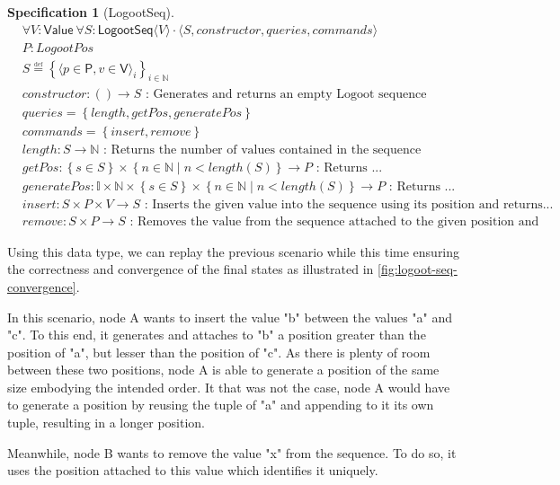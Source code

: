 \documentclass{article}
\newcommand{\commands}[1]{commands = \set{#1}}
\newcommand{\defeq}{\overset{\underset{\mathrm{def}}{}}{=}}
\newcommand{\fnspec}[3]{#1: #2 \text{ : #3}}
\newcommand{\inbb}[1]{\in \mathbb{#1}}
\newcommand{\queries}[1]{queries = \set{#1}}
\newcommand{\set}[1]{\left\{#1\right\}} %
\newcommand{\spectuple}[1]{\tuple{#1, constructor, queries, commands}}
\newcommand{\ssep}{\mid} %
\newcommand{\tuple}[1]{\langle #1 \rangle}
\theoremstyle{definition}
\newtheorem{specification}{Specification}
\begin{document}
\begin{specification}[LogootSeq]
    \begin{align*}
    &\forall V: \mathsf{Value} \ \forall S: \mathsf{LogootSeq} \tuple{V} \cdot \spectuple{S}\\
    &P: LogootPos\\
    &S \defeq \set{\tuple{p \in \mathsf{P}, v \in \mathsf{V}}_i}_{i \inbb{N}}\\
    &\fnspec{constructor}{\left( \right) \to S}{Generates and returns an empty Logoot sequence}\\
    &\queries{length, getPos, generatePos}\\
    &\commands{insert, remove}\\
    &\fnspec{length}{S \to \mathbb{N}}{Returns the number of values contained in the sequence}\\
    &\fnspec{getPos}{\set{s \in S} \times \set{n \inbb{N} \ssep n < length(S)} \to P}{Returns ...}\\
    &\fnspec{generatePos}{\mathbb{I} \times \mathbb{N} \times \set{s \in S} \times \set{n \inbb{N} \ssep n < length(S)} \to P}{Returns ...}\\
    &\fnspec{insert}{S \times P \times V \to S}{Inserts the given value into the sequence using its position and returns...}\\
    &\fnspec{remove}{S \times P \to S}{Removes the value from the sequence attached to the given position and returns...}
    \end{align*}
    \label{spec:logoot-seq}
\end{specification}

Using this data type, we can replay the previous scenario while this time ensuring the correctness and convergence of the final states as illustrated in \autoref{fig:logoot-seq-convergence}.

In this scenario, node A wants to insert the value "b" between the values "a" and "c".
To this end, it generates and attaches to "b" a position greater than the position of "a", but lesser than the position of "c".
As there is plenty of room between these two positions, node A is able to generate a position of the same size embodying the intended order.
It that was not the case, node A would have to generate a position by reusing the tuple of "a" and appending to it its own tuple, resulting in a longer position.

Meanwhile, node B wants to remove the value "x" from the sequence.
To do so, it uses the position attached to this value which identifies it uniquely.
\end{document}
